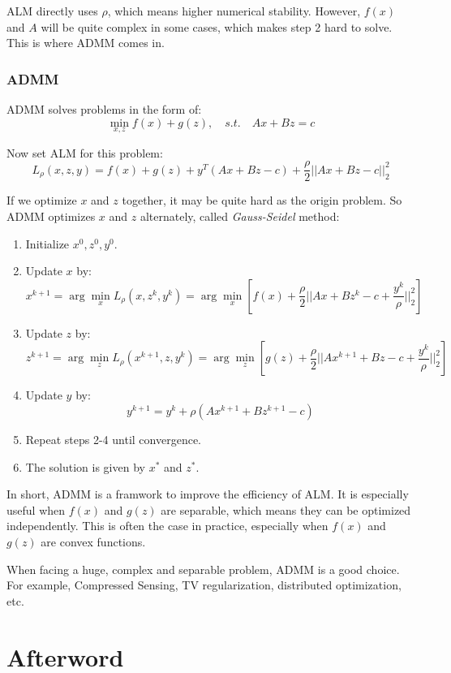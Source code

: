 \documentclass[10pt,a4paper,oneside,numbers=noenddot]{scrbook}
\theoremstyle{ctplain}
\theoremstyle{ctresult}
\begin{document}
ALM directly uses $\rho$, which means higher numerical stability. However, $f(x)$
and $A$ will be quite complex in some cases, which makes step 2 hard to solve.
This is where ADMM comes in.

\subsection{ADMM}

ADMM solves problems in the form of:
\[
  \min_{x,z} f(x) + g(z), \quad s.t. \quad Ax + Bz = c
\]

Now set ALM for this problem:
\[
  L_\rho(x, z, y) = f(x) + g(z) + y^T (Ax + Bz - c) + \frac{\rho}{2}
  ||Ax + Bz - c||_2^2
\]

If we optimize $x$ and $z$ together, it may be quite hard as the origin problem.
So ADMM optimizes $x$ and $z$ alternately, called \emph{Gauss-Seidel} method:
\begin{enumerate}
  \item Initialize $x^0, z^0, y^0$.
  \item Update $x$ by:
  \[
    x^{k+1} = \arg\min_x L_\rho(x, z^k, y^k) = \arg\min_x\left[ f(x) + \frac{\rho}{2}
    ||Ax + Bz^k - c + \frac{y^k}{\rho}||_2^2\right]
  \]
  \item Update $z$ by:
  \[
    z^{k+1} = \arg\min_z L_\rho(x^{k+1}, z, y^k) = \arg\min_z\left[ g(z) + \frac{\rho}{2}
    ||Ax^{k+1} + Bz - c + \frac{y^k}{\rho}||_2^2\right]
  \]
  \item Update $y$ by:
  \[
    y^{k+1} = y^k + \rho (Ax^{k+1} + Bz^{k+1} - c)
  \]
  \item Repeat steps 2-4 until convergence.
  \item The solution is given by $x^*$ and $z^*$.
\end{enumerate}

In short, ADMM is a framwork to improve the efficiency of ALM. It is especially
useful when $f(x)$ and $g(z)$ are separable, which means they can be optimized
independently. This is often the case in practice, especially when $f(x)$ and
$g(z)$ are convex functions.

When facing a huge, complex and separable problem, ADMM is a good choice.
For example, Compressed Sensing, TV regularization, distributed optimization, etc.

\newpage
\chapter*{Afterword}
\end{document}
